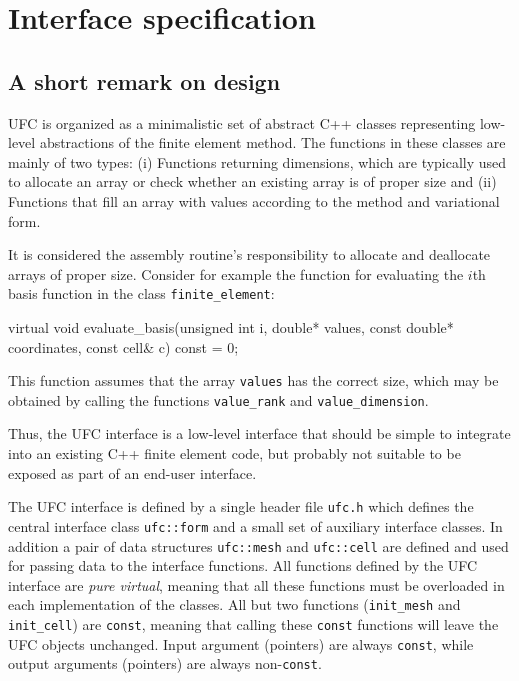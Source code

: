 \chapter{Interface specification}
\label{sec:interface}


\section{A short remark on design}

UFC is organized as a minimalistic set of abstract C++ classes 
representing low-level abstractions of the finite element method. The
functions in these classes are mainly of two types: (i) Functions
returning dimensions, which are typically used to allocate an array or
check whether an existing array is of proper size and (ii) Functions
that fill an array with values according to the method and variational
form.

It is considered the assembly routine's responsibility
to allocate and deallocate arrays of proper size.
Consider for example the function for evaluating the $i$th basis
function in the class \texttt{finite\_element}:
\begin{code}
virtual void evaluate_basis(unsigned int i, double* values,
                            const double* coordinates,
                            const cell& c) const = 0;
\end{code}
This function assumes that the array \texttt{values} has the correct
size, which may be obtained by calling the functions
\texttt{value\_rank} and \texttt{value\_dimension}.

Thus, the UFC interface is a low-level interface that should be simple
to integrate into an existing C++ finite element code, but probably
not suitable to be exposed as part of an end-user interface.

The UFC interface is defined by a single header file \texttt{ufc.h}
which defines the central interface class \texttt{ufc::form} and a
small set of auxiliary interface classes. In addition a pair of data
structures \texttt{ufc::mesh} and \texttt{ufc::cell} are defined and
used for passing data to the interface functions. All functions
defined by the UFC interface are \emph{pure virtual}, meaning that all
these functions must be overloaded in each implementation of the classes.
All but two functions (\texttt{init\_mesh} and
\texttt{init\_cell}) are \texttt{const}, meaning that calling these
\texttt{const} functions will leave the UFC objects unchanged.
Input argument (pointers) are always \texttt{const}, while output arguments (pointers) are always non-\texttt{const}.

